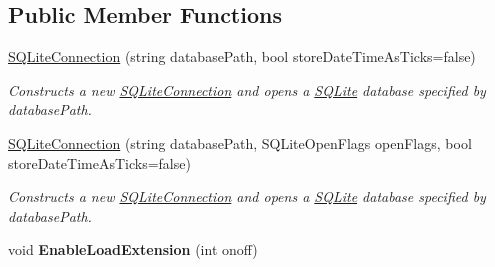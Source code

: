 \subsection*{Public Member Functions}
\begin{DoxyCompactItemize}
\item 
\hyperlink{classSQLite_1_1SQLiteConnection_a21204da14d0e2a44039f3395bb4ff12d}{S\-Q\-Lite\-Connection} (string database\-Path, bool store\-Date\-Time\-As\-Ticks=false)
\begin{DoxyCompactList}\small\item\em Constructs a new \hyperlink{classSQLite_1_1SQLiteConnection}{S\-Q\-Lite\-Connection} and opens a \hyperlink{namespaceSQLite}{S\-Q\-Lite} database specified by database\-Path. \end{DoxyCompactList}\item 
\hyperlink{classSQLite_1_1SQLiteConnection_a5d0deb6299d3f479e53cf81899023457}{S\-Q\-Lite\-Connection} (string database\-Path, S\-Q\-Lite\-Open\-Flags open\-Flags, bool store\-Date\-Time\-As\-Ticks=false)
\begin{DoxyCompactList}\small\item\em Constructs a new \hyperlink{classSQLite_1_1SQLiteConnection}{S\-Q\-Lite\-Connection} and opens a \hyperlink{namespaceSQLite}{S\-Q\-Lite} database specified by database\-Path. \end{DoxyCompactList}\item 
\hypertarget{classSQLite_1_1SQLiteConnection_ae9cb05b6c85322d73dd70688182edb01}{void {\bfseries Enable\-Load\-Extension} (int onoff)}\label{classSQLite_1_1SQLiteConnection_ae9cb05b6c85322d73dd70688182edb01}


\end{DoxyCompactItemize}
